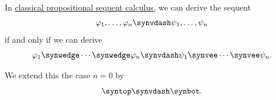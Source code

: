 \begin{proposition}\label{thm:propositional_sequent_calculus_characterization}
  In \hyperref[def:classical_propositional_sequent_calculus]{classical propositional sequent calculus}, we can derive the sequent
  \begin{equation}\label{eq:thm:propositional_sequent_calculus_characterization/multiple}
    \varphi_1, \ldots, \varphi_n \synvdash \psi_1, \ldots, \psi_n
  \end{equation}
  if and only if we can derive
  \begin{equation}\label{eq:thm:propositional_sequent_calculus_characterization/single}
    \varphi_1 \synwedge \cdots \synwedge \varphi_n \synvdash \psi_1 \synvee \cdots \synvee \psi_n.
  \end{equation}

  We extend this the case \( n = 0 \) by
  \begin{equation}\label{eq:thm:propositional_sequent_calculus_characterization/zero}
    \syntop \synvdash \synbot.
  \end{equation}
\end{proposition}
